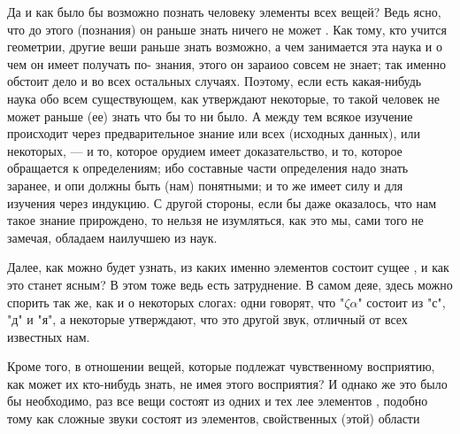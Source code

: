 \documentclass{article}
\begin{document}
Да и как было бы возможно познать человеку элементы всех вещей? Ведь ясно, что до этого (познания) он раньше знать ничего не может . Как тому, кто учится геометрии, другие веши раньше знать возможно, а чем занимается эта наука и о чем он имеет получать по- знания, этого он зараиоо совсем не знает; так именно обстоит дело и во всех остальных случаях. Поэтому, если есть какая-нибудь наука обо всем существующем, как утверждают некоторые,
\footnotemark[40]
то такой человек не может раньше (ее) знать что бы то ни было. А между тем всякое изучение происходит через предварительное знание или всех (исходных данных), или некоторых, — и то, которое орудием имеет доказательство, и то, которое обращается к определениям; ибо составные части определения надо знать заранее, и опи должны быть (нам) понятными; и то же имеет силу и для изучения через индукцию.
\footnotemark[41]
С другой стороны, если бы даже оказалось, что нам такое знание прирождено,
\footnotemark[42]
то нельзя не изумляться, как это мы, сами того не замечая, обладаем наилучшею из наук.

Далее, как можно будет узнать, из каких именно элементов состоит сущее , и как это станет ясным? В этом тоже ведь есть затруднение. В самом деяе, здесь можно спорить так же, как и о некоторых слогах: одни говорят, что "$\zeta \alpha$" состоит из "с", "д" и "я", а некоторые утверждают, что это другой звук, отличный от всех известных нам.

Кроме того, в отношении вещей, которые подлежат чувственному восприятию, как может их кто-нибудь знать, не имея этого восприятия? И однако же это было бы необходимо, раз все вещи состоят из одних и тех лее элементов , подобно тому как сложные звуки состоят из элементов, свойственных (этой) области
\footnotemark[44]
\end{document}
